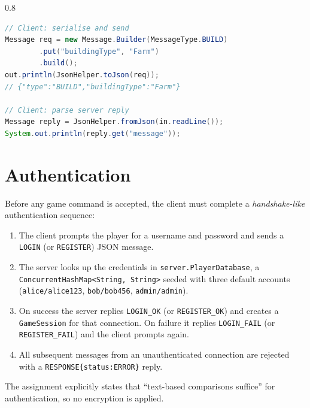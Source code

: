 \documentclass[format=acmsmall, review=false, screen=true]{acmart}
\begin{document}
\begin{spacing}{0.8}
\begin{lstlisting}[language=Java, caption={Sending a BUILD request and receiving the response.},
                   label=lst:json]
// Client: serialise and send
Message req = new Message.Builder(MessageType.BUILD)
        .put("buildingType", "Farm")
        .build();
out.println(JsonHelper.toJson(req));
// {"type":"BUILD","buildingType":"Farm"}

// Client: parse server reply
Message reply = JsonHelper.fromJson(in.readLine());
System.out.println(reply.get("message"));
\end{lstlisting}
\end{spacing}

\section{Authentication}

Before any game command is accepted, the client must complete a
\emph{handshake-like} authentication sequence:

\begin{enumerate}[noitemsep]
  \item The client prompts the player for a username and password and sends a
        \texttt{LOGIN} (or \texttt{REGISTER}) JSON message.
  \item The server looks up the credentials in \texttt{server.PlayerDatabase}, a
        \texttt{ConcurrentHashMap<String, String>} seeded with three default
        accounts (\texttt{alice/alice123}, \texttt{bob/bob456},
        \texttt{admin/admin}).
  \item On success the server replies \texttt{LOGIN\_OK} (or
        \texttt{REGISTER\_OK}) and creates a \texttt{GameSession} for that
        connection.  On failure it replies \texttt{LOGIN\_FAIL} (or
        \texttt{REGISTER\_FAIL}) and the client prompts again.
  \item All subsequent messages from an unauthenticated connection are rejected
        with a \texttt{RESPONSE\{status:ERROR\}} reply.
\end{enumerate}

The assignment explicitly states that ``text-based comparisons suffice'' for
authentication, so no encryption is applied.
\end{document}
